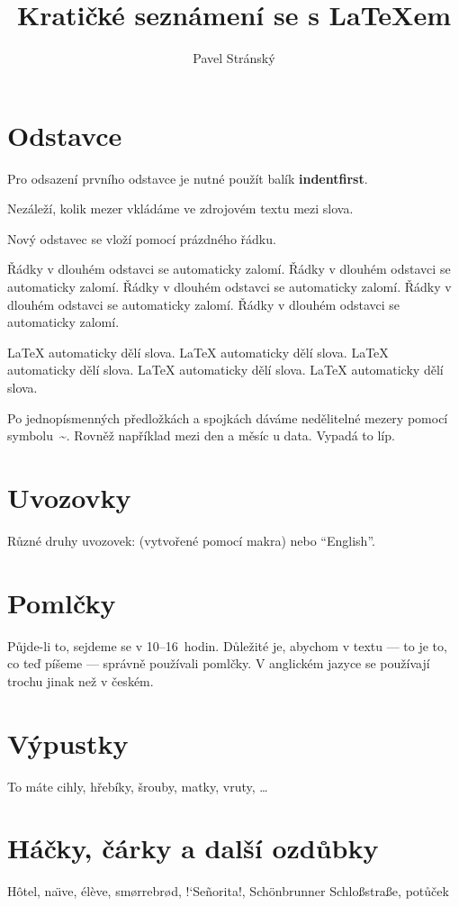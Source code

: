 \documentclass{article}
\author{Pavel Stránský}
\title{Kratičké seznámení se s \LaTeX em}
\def\uv#1{\clqq{#1}\crqq}	%
\begin{document}
	\maketitle
	
	\section{Odstavce}	
	\label{sec:odstavce}
	Pro odsazení prvního odstavce je nutné použít balík \textbf{indentfirst}.

	Nezáleží,      kolik
	mezer      vkládáme       ve zdrojovém
	textu
	mezi     slova.
	
	Nový odstavec se vloží pomocí prázdného řádku.
	
	Řádky v dlouhém odstavci se automaticky zalomí. 
	Řádky v dlouhém odstavci se automaticky zalomí. 
	Řádky v dlouhém odstavci se automaticky zalomí. 
	Řádky v dlouhém odstavci se automaticky zalomí. 
	Řádky v dlouhém odstavci se automaticky zalomí. 
	
	\LaTeX{} automaticky dělí slova.
	\LaTeX{} automaticky dělí slova.
	\LaTeX{} automaticky dělí slova.
	\LaTeX{} automaticky dělí slova.
	\LaTeX{} automaticky dělí slova.
	
	Po jednopísmenných předložkách a spojkách dáváme nedělitelné mezery pomocí symbolu~\~{}.
	Rovněž například mezi den a měsíc u data.
	Vypadá to líp.
	
	\section{Uvozovky}
	Různé druhy uvozovek: \uv{české} (vytvořené pomocí makra) nebo ``English''.

	\section{Pomlčky}
	Půjde-li to, sejdeme se v 10--16~hodin.
	Důležité je, abychom v textu --- to je to, co teď píšeme --- správně používali pomlčky.
	V anglickém jazyce se používají trochu jinak než v českém.
	
	\section{Výpustky}
	To máte cihly, hřebíky, šrouby, matky, vruty, \ldots

	\section{Háčky, čárky a další ozdůbky}
	\label{sec:akcenty}
	H\^otel,
	na\"\i ve, 
	\'el\`eve, 
	sm\o rrebr\o d, 
	!‘Se\~norita!,	
	Sch\"onbrunner Schlo\ss stra\ss e,
	pot\r u\v cek
	
\end{document}
